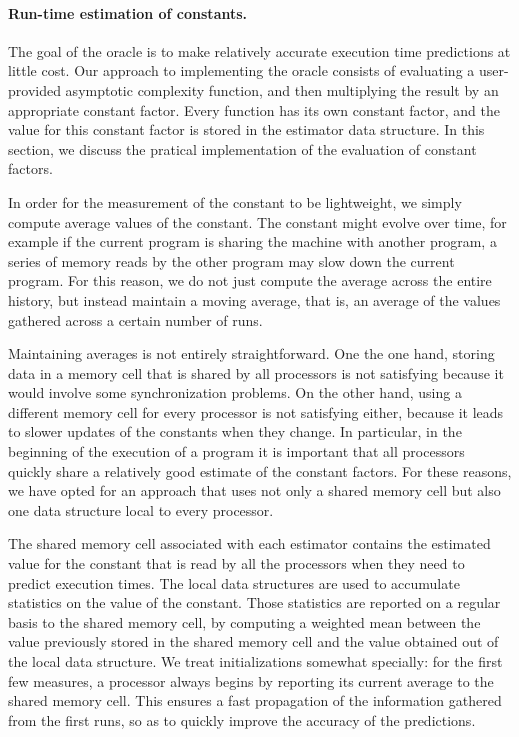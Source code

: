\paragraph{Run-time estimation of constants.}

The goal of the oracle is to make relatively accurate execution 
time predictions at little cost. Our approach to implementing
the oracle consists of evaluating a user-provided asymptotic
complexity function, and then multiplying the result by an
appropriate constant factor. Every function has its own constant
factor, and the value for this constant factor is stored in the
estimator data structure.
In this section, we discuss the pratical implementation of the 
evaluation of constant factors.

In order for the measurement of the constant to be lightweight, we
simply compute average values of the constant.  The constant might
evolve over time, for example if the current program is sharing the
machine with another program, a series of memory reads by the other
program may slow down the current program.  For this reason, we do not
just compute the average across the entire history, but instead
maintain a moving average, that is, an average of the values gathered
across a certain number of runs.

Maintaining averages is not entirely straightforward.
One the one hand, storing data in a memory cell 
that is shared by all processors is not satisfying because it would involve 
some synchronization problems. On the other hand, using a
different memory cell for every processor is not satisfying either,
because it leads to slower updates of the constants when they change.
In particular, in the beginning of the execution of a program
it is important that all processors quickly share a relatively good
estimate of the constant factors.
For these reasons, we have opted for an approach that
uses not only a shared memory cell but also one data structure
local to every processor. 

The shared memory cell associated with each estimator contains the
estimated value for the constant that is read by all the processors
when they need to predict execution times. The local data structures
are used to accumulate statistics on the value of the constant. Those
statistics are reported on a regular basis to the shared memory cell,
by computing a weighted mean between the value previously stored in
the shared memory cell and the value obtained out of the local data
structure. We treat initializations somewhat specially: for the first
few measures, a processor always begins by reporting its current
average to the shared memory cell. This ensures a fast propagation of
the information gathered from the first runs, so as to quickly improve
the accuracy of the predictions.

